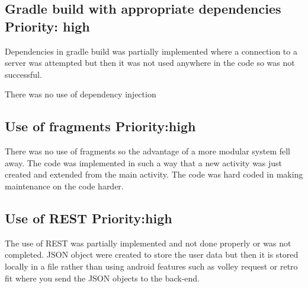 \subsection{Gradle build with appropriate dependencies Priority: high }
Dependencies in gradle build was partially implemented where a connection to a server was attempted but then it was not used anywhere in the code so was not successful.

There was no use of dependency injection 

\subsection{Use of fragments Priority:high }

There was no use of fragments so the advantage of a more modular system fell away. The code was implemented in such a way that a new activity was just created and extended from the main activity. The code was hard coded in making maintenance on the code harder. 

\subsection{Use of REST Priority:high }

The use of REST was partially implemented and not done properly or was not completed. JSON object were created to store the user data but then it is stored locally in a file rather than using android features such as volley request or retro fit where you send the JSON objects to the back-end.